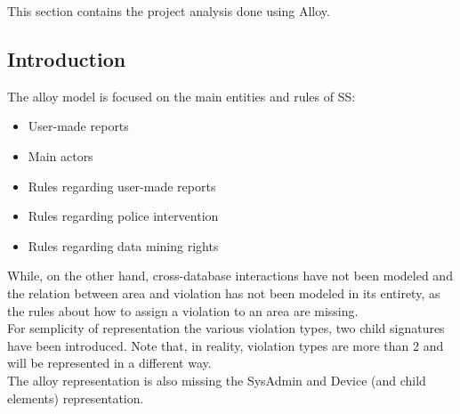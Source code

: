 

This section contains the project analysis done using Alloy.\\
\subsection{Introduction}
The alloy model is focused on the main entities and rules of SS:
\begin{itemize}
	\item User-made reports
	\item Main actors
	\item Rules regarding user-made reports
	\item Rules regarding police intervention
	\item Rules regarding data mining rights
\end{itemize}
While, on the other hand, cross-database interactions have not been modeled and the relation between area and violation has not been modeled in its entirety, as the rules about how to assign a violation to an area are missing.\\  
For semplicity of representation the various violation types, two child signatures have been introduced. Note that, in reality, violation types are more than 2 and will be represented in a different way.\\
The alloy representation is also missing the SysAdmin and Device (and child elements) representation.\\
\\
\newpage
